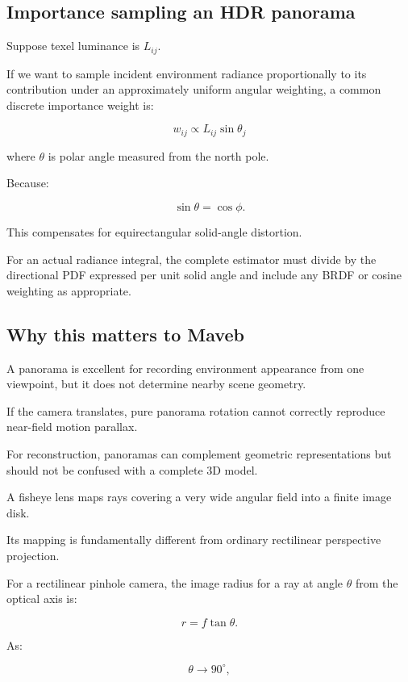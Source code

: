 \subsection{Importance sampling an HDR panorama}\label{02-foundations-ii-ch035-importance-sampling-an-hdr-panorama}

Suppose texel luminance is \(L_{ij}\).

If we want to sample incident environment radiance proportionally to its contribution under an approximately uniform angular weighting, a common discrete importance weight is:

\[ \boxed{ w_{ij}\propto L_{ij}\sin\theta_j } \]

where \(\theta\) is polar angle measured from the north pole.

Because:

\[ \sin\theta=\cos\phi. \]

This compensates for equirectangular solid-angle distortion.

For an actual radiance integral, the complete estimator must divide by the directional PDF expressed per unit solid angle and include any BRDF or cosine weighting as appropriate.

\subsection{Why this matters to Maveb}\label{02-foundations-ii-ch035-why-this-matters-to-maveb}

A panorama is excellent for recording environment appearance from one viewpoint, but it does not determine nearby scene geometry.

If the camera translates, pure panorama rotation cannot correctly reproduce near-field motion parallax.

For reconstruction, panoramas can complement geometric representations but should not be confused with a complete 3D model.

A fisheye lens maps rays covering a very wide angular field into a finite image disk.

Its mapping is fundamentally different from ordinary rectilinear perspective projection.

For a rectilinear pinhole camera, the image radius for a ray at angle \(\theta\) from the optical axis is:

\[ \boxed{ r=f\tan\theta. } \]

As:

\[ \theta\to90^\circ, \]

